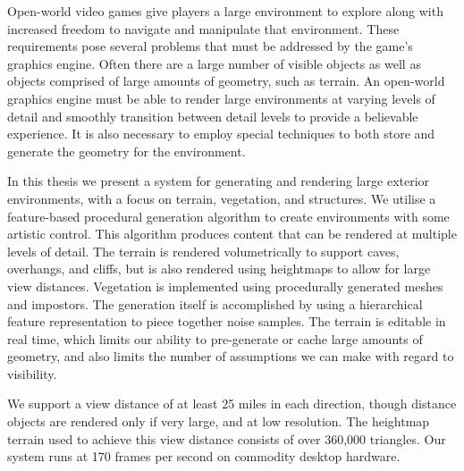 Open-world video games give players a large environment to explore along with increased freedom to navigate and manipulate that environment.
These requirements pose several problems that must be addressed by the game’s graphics engine.
Often there are a large number of visible objects as well as objects comprised of large amounts of geometry, such as terrain.
An open-world graphics engine must be able to render large environments at varying levels of detail and smoothly transition between detail levels to provide a believable experience.
It is also necessary to employ special techniques to both store and generate the geometry for the environment.

In this thesis we present a system for generating and rendering large exterior environments, with a focus on terrain, vegetation, and structures.
We utilise a feature-based procedural generation algorithm to create environments with some artistic control.
This algorithm produces content that can be rendered at multiple levels of detail.
The terrain is rendered volumetrically to support caves, overhangs, and cliffs, but is also rendered using heightmaps to allow for large view distances.
Vegetation is implemented using procedurally generated meshes and impostors.
The generation itself is accomplished by using a hierarchical feature representation to piece together noise samples.
The terrain is editable in real time, which limits our ability to pre-generate or cache large amounts of geometry, and also limits the number of assumptions we can make with regard to visibility.

We support a view distance of at least 25 miles in each direction, though distance objects are rendered only if very large, and at low resolution.
The heightmap terrain used to achieve this view distance consists of over 360,000 triangles.
Our system runs at 170 frames per second on commodity desktop hardware.
